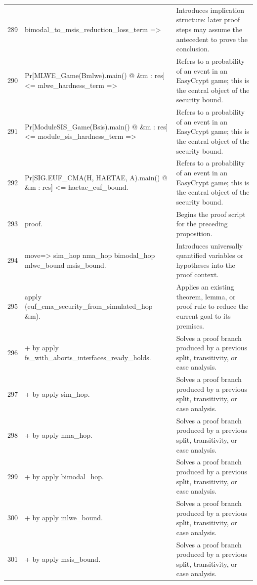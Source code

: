 \documentclass[10pt]{article}
\begin{document}
\begin{longtable}{r L{0.53\textwidth} L{0.37\textwidth}}
289 & {\ttfamily\scriptsize     bimodal\_to\_msis\_reduction\_loss\_term =>} & Introduces implication structure: later proof steps may assume the antecedent to prove the conclusion. \\
290 & {\ttfamily\scriptsize   Pr[MLWE\_Game(Bmlwe).main() @ \&m : res] <= mlwe\_hardness\_term =>} & Refers to a probability of an event in an EasyCrypt game; this is the central object of the security bound. \\
291 & {\ttfamily\scriptsize   Pr[ModuleSIS\_Game(Bsis).main() @ \&m : res] <= module\_sis\_hardness\_term =>} & Refers to a probability of an event in an EasyCrypt game; this is the central object of the security bound. \\
292 & {\ttfamily\scriptsize   Pr[SIG.EUF\_CMA(H, HAETAE, A).main() @ \&m : res] <= haetae\_euf\_bound.} & Refers to a probability of an event in an EasyCrypt game; this is the central object of the security bound. \\
293 & {\ttfamily\scriptsize proof.} & Begins the proof script for the preceding proposition. \\
294 & {\ttfamily\scriptsize move=> sim\_hop nma\_hop bimodal\_hop mlwe\_bound msis\_bound.} & Introduces universally quantified variables or hypotheses into the proof context. \\
295 & {\ttfamily\scriptsize apply (euf\_cma\_security\_from\_simulated\_hop \&m).} & Applies an existing theorem, lemma, or proof rule to reduce the current goal to its premises. \\
296 & {\ttfamily\scriptsize + by apply fs\_with\_aborts\_interfaces\_ready\_holds.} & Solves a proof branch produced by a previous split, transitivity, or case analysis. \\
297 & {\ttfamily\scriptsize + by apply sim\_hop.} & Solves a proof branch produced by a previous split, transitivity, or case analysis. \\
298 & {\ttfamily\scriptsize + by apply nma\_hop.} & Solves a proof branch produced by a previous split, transitivity, or case analysis. \\
299 & {\ttfamily\scriptsize + by apply bimodal\_hop.} & Solves a proof branch produced by a previous split, transitivity, or case analysis. \\
300 & {\ttfamily\scriptsize + by apply mlwe\_bound.} & Solves a proof branch produced by a previous split, transitivity, or case analysis. \\
301 & {\ttfamily\scriptsize + by apply msis\_bound.} & Solves a proof branch produced by a previous split, transitivity, or case analysis. \\

\end{longtable}
\end{document}
